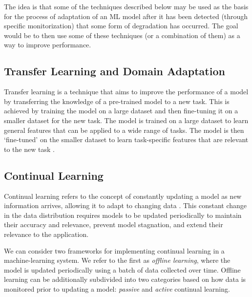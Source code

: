 \documentclass[../main.tex]{subfiles}
\begin{document}
    The idea is that some of the techniques described below may be used as the basis for the process of adaptation of an ML model after it has been detected (through specific monitorization) that some form of degradation has occurred. The goal would be to then use some of these techniques (or a combination of them) as a way to improve performance.

    

    \subsection{Transfer Learning and Domain Adaptation} \label{sec:transfer_learning} 

    Transfer learning is a technique that aims to improve the performance of a model by transferring the knowledge of a pre-trained model to a new task. This is achieved by training the model on a large dataset and then fine-tuning it on a smaller dataset for the new task. The model is trained on a large dataset to learn general features that can be applied to a wide range of tasks. The model is then `fine-tuned' on the smaller dataset to learn task-specific features that are relevant to the new task \cite{pan_survey_2010}.

	
	\subsection{Continual Learning} \label{sec:continual_learning} 
	
	 Continual learning refers to the concept of constantly updating a model as new information arrives, allowing it to adapt to changing data \cite{huyen_designing_2022}. This constant change in the data distribution requires models to be updated periodically to maintain their accuracy and relevance, prevent model stagnation, and extend their relevance to the application.

     We can consider two frameworks for implementing continual learning in a machine-learning system. We refer to the first as \textit{offline learning}, where the model is updated periodically using a batch of data collected over time. Offline learning can be additionally subdivided into two categories based on how data is monitored prior to updating a model: \textit{passive} and \textit{active} continual learning.
\end{document}
